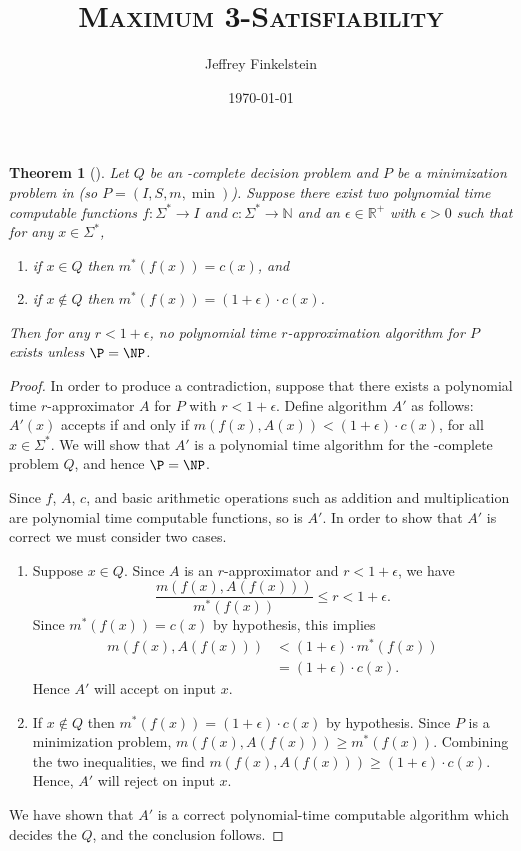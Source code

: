 \documentclass[]{article}
\author{Jef{}frey Finkelstein}
\date{\today}
\title{\texorpdfstring{\textsc{Maximum 3-Satisfiability}}{Maximum 3-Satisfiability}}
\theoremstyle{plain}
\newtheorem{theorem}{Theorem}
\begin{document}
\maketitle

\begin{theorem}[{\cite[Theorem~3.7]{book}}]
  Let $Q$ be an \NP-complete decision problem and $P$ be a minimization problem in \NPO{} (so $P=(I, S, m, \min)$).
  Suppose there exist two polynomial time computable functions $f\colon\Sigma^*\to I$ and $c\colon \Sigma^*\to\mathbb{N}$ and an $\epsilon\in\mathbb{R}^+$ with $\epsilon>0$ such that for any $x\in\Sigma^*$,
  \begin{enumerate}
  \item if $x \in Q$ then $m^*(f(x)) = c(x)$, and
  \item if $x \notin Q$ then $m^*(f(x)) = (1 + \epsilon) \cdot c(x)$.
  \end{enumerate}
  Then for any $r < 1 + \epsilon$, no polynomial time $r$-approximation algorithm for $P$ exists unless $\P=\NP$.
\end{theorem}
\begin{proof}
  In order to produce a contradiction, suppose that there exists a polynomial time $r$-approximator $A$ for $P$ with $r < 1 + \epsilon$.
  Define algorithm $A'$ as follows: $A'(x)$ accepts if and only if $m(f(x), A(x)) < (1 + \epsilon) \cdot c(x)$, for all $x\in\Sigma^*$.
  We will show that $A'$ is a polynomial time algorithm for the \NP-complete problem $Q$, and hence $\P=\NP$.

  Since $f$, $A$, $c$, and basic arithmetic operations such as addition and multiplication are polynomial time computable functions, so is $A'$.
  In order to show that $A'$ is correct we must consider two cases.
  \begin{enumerate}
  \item
    Suppose $x \in Q$.
    Since $A$ is an $r$-approximator and $r < 1 + \epsilon$, we have
    \begin{displaymath}
      \frac{m(f(x), A(f(x)))}{m^*(f(x))} \leq r < 1 + \epsilon.
    \end{displaymath}
    Since $m^*(f(x)) = c(x)$ by hypothesis, this implies
    \begin{align*}
      m(f(x), A(f(x))) & < (1 + \epsilon) \cdot m^*(f(x)) \\
      & = (1 + \epsilon) \cdot c(x).
    \end{align*}
    Hence $A'$ will accept on input $x$.
  \item
    If $x \notin Q$ then $m^*(f(x)) = (1 + \epsilon) \cdot c(x)$ by hypothesis.
    Since $P$ is a minimization problem, $m(f(x), A(f(x))) \geq m^*(f(x))$.
    Combining the two inequalities, we find $m(f(x), A(f(x))) \geq (1 + \epsilon) \cdot c(x)$.
    Hence, $A'$ will reject on input $x$.
  \end{enumerate}
  We have shown that $A'$ is a correct polynomial-time computable algorithm which decides the $Q$, and the conclusion follows.
\end{proof}
\end{document}
